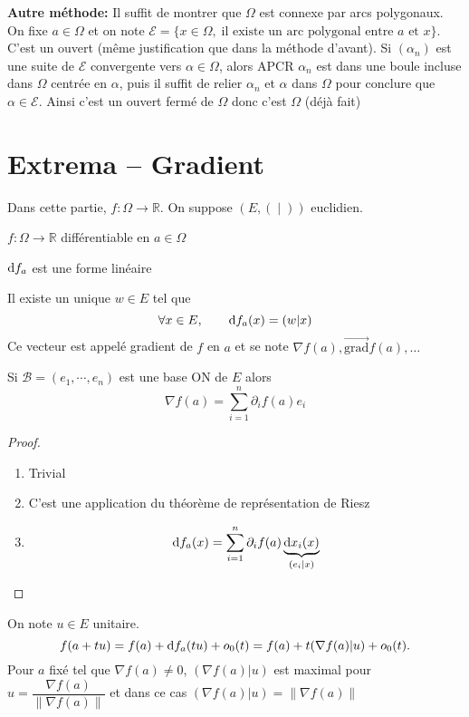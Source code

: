 \textbf{Autre méthode:} Il suffit de montrer que $\Omega$ est connexe par arcs polygonaux. On fixe $a\in\Omega$ et on note $\mathcal E=\{x\in\Omega, \; \text{il existe un arc polygonal entre }a \text{ et } x\}$. C'est un ouvert (même justification que dans la méthode d'avant). Si $(\alpha_n)$ est une suite de $\mathcal E$ convergente vers $\alpha\in\Omega$, alors APCR $\alpha_n$ est dans une boule incluse dans $\Omega$ centrée en $\alpha$, puis il suffit de relier $\alpha_n$ et $\alpha$ dans $\Omega$ pour conclure que $\alpha\in\mathcal E$. Ainsi c'est un ouvert fermé de $\Omega$ donc c'est $\Omega$ (déjà fait)

\section{Extrema -- Gradient}

Dans cette partie, $f:\Omega\to\mathbb R$. On suppose $(E, (\;|\;))$ euclidien.

\begin{thmdef}
    \Hyp $f:\Omega\to\mathbb R$ différentiable en $a\in\Omega$
    \begin{concenum}
    \item $\mathrm{d} f_a$ est une forme linéaire
    \item Il existe un unique $w\in E$ tel que \[
            \forall x\in E, \qquad \mathrm{d} f_a(x)=(w|x)
        \]
        Ce vecteur est appelé gradient de $f$ en $a$ et se note $\nabla f(a), \overrightarrow{\mathrm{grad}} f(a), \dots$
    \item Si $\mathcal B=(e_1, \cdots, e_n)$ est une base ON de $E$ alors \[
            \nabla f(a)=\sum_{i=1}^n\partial_i f(a)e_i
        \]
    \end{concenum}
\end{thmdef}

\begin{proof}~
    \begin{enumerate}
        \item Trivial
        \item C'est une application du théorème de représentation de Riesz
        \item \[
                \mathrm{d} f_a(x)=\sum_{i=1}^n\partial_if(a)\underbrace{\mathrm{d} x_i(x)}_{(e_i|x)}
            \]
    \end{enumerate}
\end{proof}

\begin{rem}
    On note $u\in E$ unitaire. \[ f(a+tu)=f(a)+\mathrm{d} f_a(tu)+o_0(t)=f(a)+t (\nabla f(a)|u) +o_0(t).\] Pour $a$ fixé tel que $\nabla f(a)\neq 0$, $(\nabla f(a)|u)$ est maximal pour $u=\dfrac{\nabla f(a)}{\|\nabla f(a)\|}$ et dans ce cas $(\nabla f(a)|u)=\|\nabla f(a)\|$
\end{rem}

